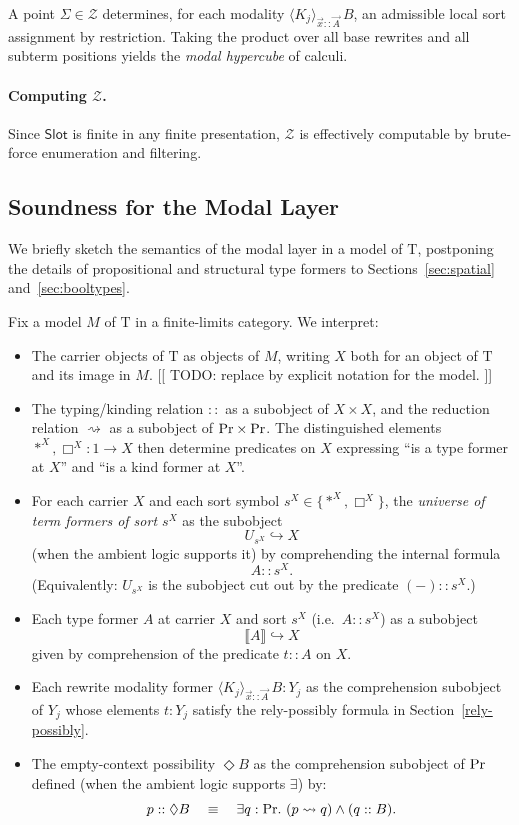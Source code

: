 \documentclass[11pt]{article}
\theoremstyle{definition}
\theoremstyle{plain}
\theoremstyle{remark}
\theoremstyle{plain}
\newcommand{\angles}[3]{\langle #1 \rangle_{#2}\,#3}
\newcommand{\sem}[1]{\llbracket #1 \rrbracket}
\renewcommand{\Pr}{{\rm Pr}}
\newcommand{\rsq}{\rightsquigarrow}
\newcommand{\mrm}[1]{\mathrm{#1}}
\newcommand{\T}{\mrm{T}}
\begin{document}
A point $\Sigma\in\mathcal{Z}$ determines, for each modality $\angles{K_j}{\vec{x}::\vec{A}}{B}$, an admissible local sort assignment by restriction.  Taking the product over all base rewrites and all subterm positions yields the \emph{modal hypercube} of calculi.

\paragraph{Computing $\mathcal{Z}$.}
Since $\mathsf{Slot}$ is finite in any finite presentation, $\mathcal{Z}$ is effectively computable by brute-force enumeration and filtering.

\subsection{Soundness for the Modal Layer}
\label{subsec:modal-soundness}

We briefly sketch the semantics of the modal layer in a model of $\T$, postponing the details of propositional and structural type formers to Sections~\ref{sec:spatial} and~\ref{sec:booltypes}.

Fix a model $M$ of $\T$ in a finite-limits category.  We interpret:

\begin{itemize}[leftmargin=2em]
  \item The carrier objects of $\T$ as objects of $M$, writing $X$ both for an object of $\T$ and its image in $M$. [[ TODO: replace by explicit notation for the model. ]]

  \item The typing/kinding relation $::$ as a subobject of $X\times X$, and the reduction relation $\rsq$ as a subobject of $\Pr\times \Pr$.  The distinguished elements $*^{X},\Box^{X}:1\to X$ then determine predicates on $X$ expressing ``is a type former at $X$'' and ``is a kind former at $X$''.

  \item For each carrier $X$ and each sort symbol $s^{X}\in\{*^{X},\Box^{X}\}$, the \emph{universe of term formers of sort $s^{X}$} as the subobject
  \[
    U_{s^{X}} \hookrightarrow X
  \]
  (when the ambient logic supports it) by comprehending the internal formula
  \[
    A:: s^{X}.
  \]
  (Equivalently: $U_{s^{X}}$ is the subobject cut out by the predicate $(-)::s^X$.)

  \item Each type former $A$ at carrier $X$ and sort $s^{X}$ (i.e.\ $A::s^{X}$) as a subobject
  \[
    \sem{A} \hookrightarrow X
  \]
  given by comprehension of the predicate $t::A$ on $X$.

  \item Each rewrite modality former $\angles{K_j}{\vec{x}::\vec{A}}{B}:Y_j$ as the comprehension subobject of $Y_j$ whose elements $t:Y_j$ satisfy the rely-possibly formula in Section~\ref{rely-possibly}.

  \item The empty-context possibility $\Diamond B$ as the comprehension subobject of $\Pr$ defined (when the ambient logic supports $\exists$) by:
  \[
    p::\Diamond B \quad\equiv\quad \exists q:\Pr.\ (p\rsq q)\wedge(q::B).
  \]
\end{itemize}
\end{document}
